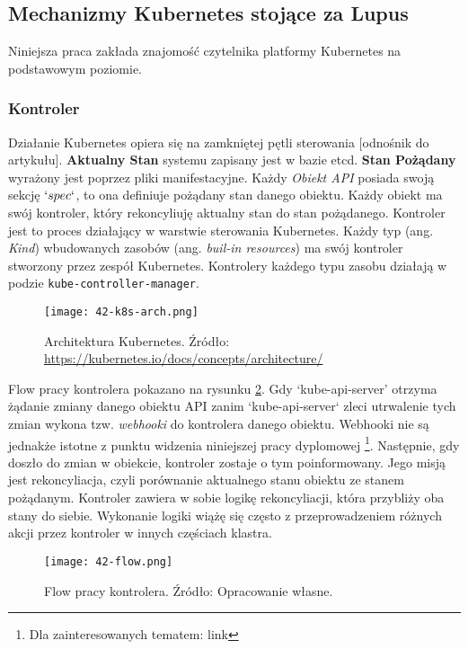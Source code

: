\subsection{Mechanizmy Kubernetes stojące za Lupus}
Niniejsza praca zakłada znajomość czytelnika platformy Kubernetes na podstawowym poziomie.

\subsubsection{Kontroler}
Działanie Kubernetes opiera się na zamkniętej pętli sterowania [odnośnik do artykułu]. \textbf{Aktualny Stan} systemu zapisany jest w bazie etcd. \textbf{Stan Pożądany} wyrażony jest poprzez pliki manifestacyjne. Każdy \textit{Obiekt API} posiada swoją sekcję $`spec`$, to ona definiuje pożądany stan danego obiektu. Każdy obiekt ma swój kontroler, który rekoncyliuję aktualny stan do stan pożądanego. Kontroler jest to proces działający w warstwie sterowania Kubernetes. Każdy typ (ang. \textit{Kind}) wbudowanych zasobów (ang. \textit{buil-in resources}) ma swój kontroler stworzony przez zespół Kubernetes. Kontrolery każdego typu zasobu działają w podzie \texttt{kube-controller-manager}. 

\begin{figure}[!h]
    \centering \texttt{[image: 42-k8s-arch.png]}
    \caption{Architektura Kubernetes. Źródło: \url{https://kubernetes.io/docs/concepts/architecture/}}\label{fig:42-k8s-arch}
\end{figure}

Flow pracy kontrolera pokazano na rysunku \ref{fig:42-flow}. Gdy `kube-api-server' otrzyma żądanie zmiany danego obiektu API zanim `kube-api-server` zleci utrwalenie tych zmian wykona tzw. \textit{webhooki} do kontrolera danego obiektu. Webhooki nie są jednakże istotne z punktu widzenia niniejszej pracy dyplomowej \footnote{Dla zainteresowanych tematem: link}. Następnie, gdy doszło do zmian w obiekcie, kontroler zostaje o tym poinformowany. Jego misją jest rekoncyliacja, czyli porównanie aktualnego stanu obiektu ze stanem pożądanym. Kontroler zawiera w sobie logikę rekoncyliacji, która przybliży oba stany do siebie. Wykonanie logiki wiążę się często z przeprowadzeniem różnych akcji przez kontroler w innych częściach klastra. 

\begin{figure}[!h]
    \centering \texttt{[image: 42-flow.png]}
    \caption{Flow pracy kontrolera. Źródło: Opracowanie własne.}\label{fig:42-flow}
\end{figure}

